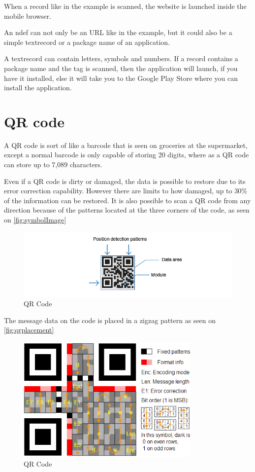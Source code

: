 When a record like in the example is scanned, the website is launched inside the mobile browser. 

An \ac{ndef} can not only be an URL like in the example, but it could also be a simple textrecord or a package name of an application. 

A textrecord can contain letters, symbols and numbers. If a record contains a package name and the tag is scanned, then the application will launch, if you have it installed, else it will take you to the Google Play Store where you can install the application. 

\section*{QR code}

A QR code is sort of like a barcode that is seen on groceries at the supermarket, except a normal barcode is only capable of storing 20 digits, where as a QR code can store up to 7,089 characters\citep{qrcode}.

Even if a QR code is dirty or damaged, the data is possible to restore due to its error correction capability. However there are limits to how damaged, up to 30\% of the information can be restored. It is also possible to scan a QR code from any direction  because of the patterns located at the three corners of the code, as seen on \autoref{fig:symbolImage} 

\begin{figure}[H]
\centering
\includegraphics[width=1.5\textwidth]{img/symbolImage.png}
\caption{QR Code\citep{qrcode}}
\label{fig:symbolImage}
\end{figure}

The message data on the code is placed in a zigzag pattern as seen on \autoref{fig:qrplacement} 

\begin{figure}[H]
\centering
\includegraphics[width=0.8\textwidth]{img/qrplacement.png}
\caption{QR Code\citep{qrcode}}
\label{fig:qrplacement}
\end{figure}

